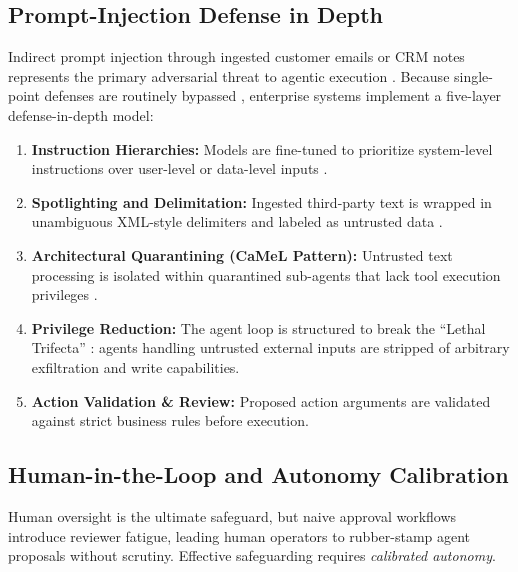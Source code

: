 \documentclass[10pt,a4paper,twocolumn]{article}
\begin{document}
\subsection{Prompt-Injection Defense in Depth}
Indirect prompt injection through ingested customer emails or CRM notes represents the primary adversarial threat to agentic execution \cite{greshake2023indirect,debenedetti2024agentdojo}. Because single-point defenses are routinely bypassed \cite{zou2023universal}, enterprise systems implement a five-layer defense-in-depth model:
\begin{enumerate}[leftmargin=*]
  \item \textbf{Instruction Hierarchies:} Models are fine-tuned to prioritize system-level instructions over user-level or data-level inputs \cite{wallace2024hierarchy}.
  \item \textbf{Spotlighting and Delimitation:} Ingested third-party text is wrapped in unambiguous XML-style delimiters and labeled as untrusted data \cite{hines2024spotlighting}.
  \item \textbf{Architectural Quarantining (CaMeL Pattern):} Untrusted text processing is isolated within quarantined sub-agents that lack tool execution privileges \cite{debenedetti2025camel}.
  \item \textbf{Privilege Reduction:} The agent loop is structured to break the ``Lethal Trifecta'' \cite{willison2025trifecta}: agents handling untrusted external inputs are stripped of arbitrary exfiltration and write capabilities.
  \item \textbf{Action Validation \& Review:} Proposed action arguments are validated against strict business rules before execution.
\end{enumerate}

\subsection{Human-in-the-Loop and Autonomy Calibration}
Human oversight is the ultimate safeguard, but naive approval workflows introduce reviewer fatigue, leading human operators to rubber-stamp agent proposals without scrutiny. Effective safeguarding requires \emph{calibrated autonomy}.
\end{document}

